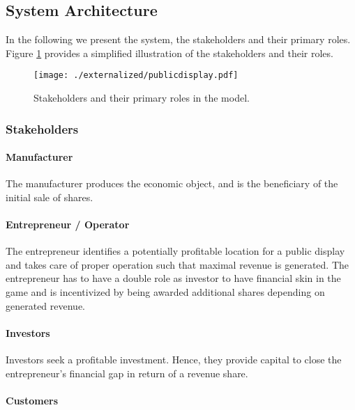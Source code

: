 \subsection{System Architecture}

In the following we present the system, the stakeholders and their primary roles. Figure \ref{fig:smartproperty} provides a simplified illustration of the stakeholders and their roles. 

\begin{figure}[!t]
    \centering
    \texttt{[image: ./externalized/publicdisplay.pdf]}
    \caption{Stakeholders and their primary roles in the model.}
    \label{fig:smartproperty}
  \end{figure}

\subsubsection{Stakeholders}

\paragraph{Manufacturer}

The manufacturer produces the economic object, and is the beneficiary of the initial sale of shares.

\paragraph{Entrepreneur / Operator}

The entrepreneur identifies a potentially profitable location for a public display and takes care of proper operation such that maximal revenue is generated. The entrepreneur has to have a double role as investor to have financial skin in the game and is incentivized by being awarded additional shares depending on generated revenue.

\paragraph{Investors}

Investors seek a profitable investment. Hence, they provide capital to close the entrepreneur's financial gap in return of a revenue share.

\paragraph{Customers}

